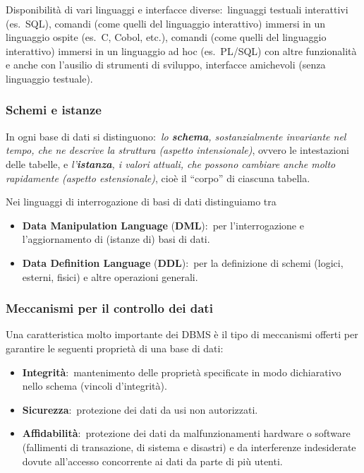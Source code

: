 Disponibilità di vari linguaggi e interfacce diverse:\ linguaggi testuali interattivi (es.\ SQL), comandi (come quelli del linguaggio interattivo) immersi in un linguaggio ospite (es.\ C, Cobol, etc.), comandi (come quelli del linguaggio interattivo) immersi in un linguaggio ad hoc (es.\ PL/SQL) con  altre funzionalità e anche con l'ausilio di strumenti di sviluppo, interfacce amichevoli (senza linguaggio testuale).

\subsubsection{Schemi e istanze}
In ogni base di dati si distinguono:\ \textit{lo \textbf{schema}, sostanzialmente invariante nel tempo, che ne descrive la struttura (aspetto intensionale)}, ovvero le intestazioni delle tabelle, e  \textit{l'\textbf{istanza}, i valori attuali, che possono cambiare anche molto rapidamente (aspetto estensionale)}, cioè il ``corpo'' di ciascuna tabella.

Nei linguaggi di interrogazione di basi di dati distinguiamo tra

\begin{itemize}
	\item \textbf{Data Manipulation Language} (\textbf{DML}):\ per l'interrogazione e l'aggiornamento di (istanze di) basi di dati.
	\item \textbf{Data Definition Language} (\textbf{DDL}):\ per la definizione di schemi (logici, esterni, fisici) e altre operazioni generali.
\end{itemize}

\subsubsection{Meccanismi per il controllo dei dati}

Una caratteristica molto importante dei DBMS è il tipo di meccanismi offerti per garantire le seguenti proprietà di una base di dati:
\begin{itemize}
	\item \textbf{Integrità}:\ mantenimento delle proprietà specificate in modo dichiarativo nello schema (vincoli d'integrità).
	\item \textbf{Sicurezza}:\ protezione dei dati da usi non autorizzati.
	\item \textbf{Affidabilità}:\ protezione dei dati da malfunzionamenti hardware o software (fallimenti di transazione, di sistema e disastri) e da interferenze indesiderate dovute all'accesso concorrente ai dati da parte di più utenti.
\end{itemize}

